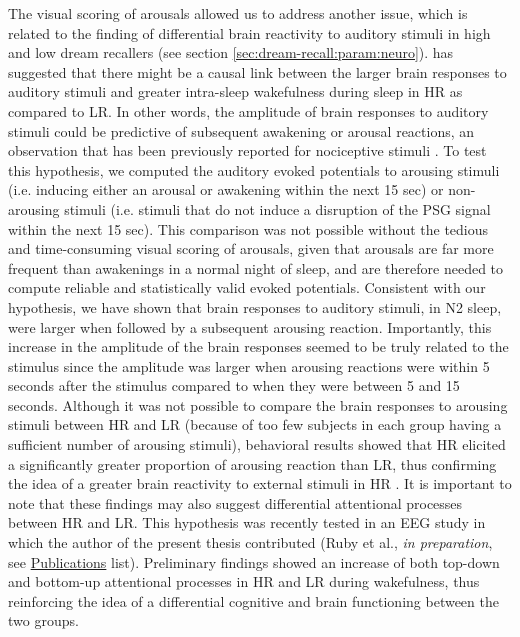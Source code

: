 The visual scoring of arousals allowed us to address another issue, which is related to the finding of differential brain reactivity to auditory stimuli in high and low dream recallers (see section \ref{sec:dream-recall:param:neuro}). \citet{eichenlaub_brain_2014} has suggested that there might be a causal link between the larger brain responses to auditory stimuli and greater intra-sleep wakefulness during sleep in HR as compared to LR. In other words, the amplitude of brain responses to auditory stimuli could be predictive of subsequent awakening or arousal reactions, an observation that has been previously reported for nociceptive stimuli \citet{bastuji_laser_2008}. To test this hypothesis, we computed the auditory evoked potentials to arousing stimuli (i.e. inducing either an arousal or awakening within the next 15 sec) or non-arousing stimuli (i.e. stimuli that do not induce a disruption of the PSG signal within the next 15 sec). This comparison was not possible without the tedious and time-consuming visual scoring of arousals, given that arousals are far more frequent than awakenings in a normal night of sleep, and are therefore needed to compute reliable and statistically valid evoked potentials. Consistent with our hypothesis, we have shown that brain responses to auditory stimuli, in N2 sleep, were larger when followed by a subsequent arousing reaction. Importantly, this increase in the amplitude of the brain responses seemed to be truly related to the stimulus since the amplitude was larger when arousing reactions were within 5 seconds after the stimulus compared to when they were between 5 and 15 seconds. Although it was not possible to compare the brain responses to arousing stimuli between HR and LR (because of too few subjects in each group having a sufficient number of arousing stimuli), behavioral results showed that HR elicited a significantly greater proportion of arousing reaction than LR, thus confirming the idea of a greater brain reactivity to external stimuli in HR \citep{eichenlaub_brain_2014}. It is important to note that these findings may also suggest differential attentional processes between HR and LR. This hypothesis was recently tested in an EEG study in which the author of the present thesis contributed (Ruby et al., \emph{in preparation}, see \hyperref[sec:publications]{Publications} list). Preliminary findings showed an increase of both top-down and bottom-up attentional processes in HR and LR during wakefulness, thus reinforcing the idea of a differential cognitive and brain functioning between the two groups.

